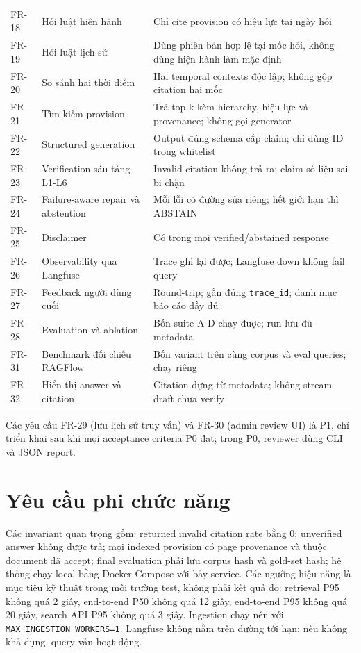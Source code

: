 \documentclass[a4paper,12pt]{extreport}
\newcommand{\code}[1]{\texttt{#1}}
\begin{document}
\begin{longtable}{p{1.6cm}p{5.2cm}p{6.5cm}}
FR-18 & Hỏi luật hiện hành & Chỉ cite provision có hiệu lực tại ngày hỏi\\
FR-19 & Hỏi luật lịch sử & Dùng phiên bản hợp lệ tại mốc hỏi, không dùng hiện hành làm mặc định\\
FR-20 & So sánh hai thời điểm & Hai temporal contexts độc lập; không gộp citation hai mốc\\
FR-21 & Tìm kiếm provision & Trả top-k kèm hierarchy, hiệu lực và provenance; không gọi generator\\
FR-22 & Structured generation & Output đúng schema cấp claim; chỉ dùng ID trong whitelist\\
FR-23 & Verification sáu tầng L1-L6 & Invalid citation không trả ra; claim số liệu sai bị chặn\\
FR-24 & Failure-aware repair và abstention & Mỗi lỗi có đường sửa riêng; hết giới hạn thì ABSTAIN\\
FR-25 & Disclaimer & Có trong mọi verified/abstained response\\
FR-26 & Observability qua Langfuse & Trace ghi lại được; Langfuse down không fail query\\
FR-27 & Feedback người dùng cuối & Round-trip; gắn đúng \code{trace\_id}; danh mục báo cáo đầy đủ\\
FR-28 & Evaluation và ablation & Bốn suite A-D chạy được; run lưu đủ metadata\\
FR-31 & Benchmark đối chiếu RAGFlow & Bốn variant trên cùng corpus và eval queries; chạy riêng\\
FR-32 & Hiển thị answer và citation & Citation dựng từ metadata; không stream draft chưa verify\\
\bottomrule
\end{longtable}

Các yêu cầu FR-29 (lưu lịch sử truy vấn) và FR-30 (admin review UI) là P1, chỉ triển khai sau khi mọi acceptance criteria P0 đạt; trong P0, reviewer dùng CLI và JSON report.

\section{Yêu cầu phi chức năng}

Các invariant quan trọng gồm: returned invalid citation rate bằng 0; unverified answer không được trả; mọi indexed provision có page provenance và thuộc document đã accept; final evaluation phải lưu corpus hash và gold-set hash; hệ thống chạy local bằng Docker Compose với bảy service. Các ngưỡng hiệu năng là mục tiêu kỹ thuật trong môi trường test, không phải kết quả đo: retrieval P95 không quá 2 giây, end-to-end P50 không quá 12 giây, end-to-end P95 không quá 20 giây, search API P95 không quá 3 giây. Ingestion chạy nền với \code{MAX\_INGESTION\_WORKERS=1}. Langfuse không nằm trên đường tới hạn; nếu không khả dụng, query vẫn hoạt động.
\end{document}
